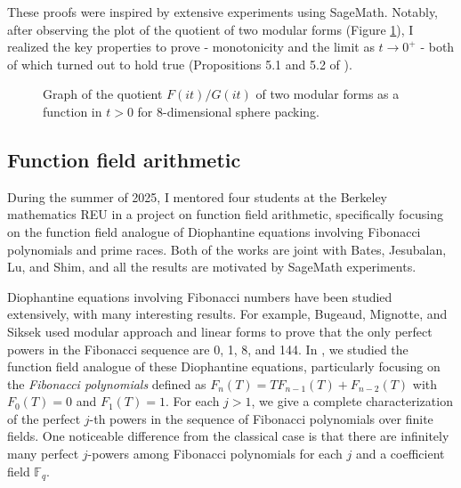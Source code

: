 \documentclass[letterpaper, 10pt]{article}
\begin{document}
These proofs were inspired by extensive experiments using SageMath. 
Notably, after observing the plot of the quotient of two modular forms (Figure \ref{fig:d8graph}), I realized the key properties to prove - monotonicity and the limit as $t \to 0^+$ - both of which turned out to hold true (Propositions 5.1 and 5.2 of \cite{lee2024algebraic}).

\begin{figure}[h]
    \centering
    
    \caption{Graph of the quotient $F(it)/G(it)$ of two modular forms as a function in $t > 0$ for 8-dimensional sphere packing.}
    \label{fig:d8graph}
\end{figure}


\subsection{Function field arithmetic}

During the summer of 2025, I mentored four students at the Berkeley mathematics REU in a project on function field arithmetic, specifically focusing on the function field analogue of Diophantine equations involving Fibonacci polynomials and prime races.
Both of the works are joint with Bates, Jesubalan, Lu, and Shim, and all the results are motivated by SageMath experiments.

Diophantine equations involving Fibonacci numbers have been studied extensively, with many interesting results.
For example, Bugeaud, Mignotte, and Siksek \cite{bugeaud2006classical} used modular approach and linear forms to prove that the only perfect powers in the Fibonacci sequence are 0, 1, 8, and 144.
In \cite{bjlls2025fibonacci}, we studied the function field analogue of these Diophantine equations, particularly focusing on the \emph{Fibonacci polynomials} defined as \(F_n(T) = T F_{n-1}(T) + F_{n-2}(T)\) with \(F_0(T) = 0\) and \(F_1(T) = 1\).
For each \(j > 1\), we give a complete characterization of the perfect \(j\)-th powers in the sequence of Fibonacci polynomials over finite fields.
One noticeable difference from the classical case is that there are infinitely many perfect \(j\)-powers among Fibonacci polynomials for each \(j\) and a coefficient field \(\mathbb{F}_q\).
\end{document}
